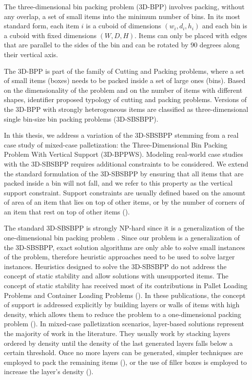 The three-dimensional bin packing problem (3D-BPP) involves packing, without any overlap, a set of small items into the minimum number of bins.
In its most standard form, each item $i$ is a cuboid of dimensions $(w_i, d_i, h_i)$ and each bin is a cuboid with fixed dimensions $(W, D, H)$.
Items can only be placed with edges that are parallel to the sides of the bin and can be rotated by $90$ degrees along their vertical axis.

The 3D-BPP is part of the family of Cutting and Packing problems, where a set of small items (boxes) needs to be packed inside a set of large ones (bins).
Based on the dimensionality of the problem and on the number of items with different shapes, \cite{WASCHER20071109} identifier proposed typology of cutting and packing problems. Versions of the 3D-BPP with strongly heterogeneous items are classified as three-dimensional single bin-size bin packing problems (3D-SBSBPP). 

In this thesis, we address a variation of the 3D-SBSBPP stemming from a real case study of mixed-case palletization: the Three-Dimensional Bin Packing Problem With Vertical Support (3D-BPPWS).
Modeling real-world case studies with the 3D-SBSBPP requires additional constraints to be considered. We extend the standard formulation of the 3D-SBSBPP by ensuring that all items that are packed inside a bin will not fall, and we refer to this property as the vertical support constraint.
Support constraints are usually defined based on the amount of area of an item that lies on top of other items, or by the number of corners of an item that rest on top of other items (\cite{GZARA20201062, paquay2016mixed, kurpel2020exact}).

The standard 3D-SBSBPP is strongly NP-hard since it is a generalization of the one-dimensional bin packing problem \citep{martello2000three}.
Since our problem is a generalization of the 3D-SBSBPP, exact solution algorithms are only able to solve small instances of the problem, therefore heuristic approaches need to be used to solve larger instances.
Heuristics designed to solve the 3D-SBSBPP do not address the concept of static stability and allow solutions with unsupported items.
The concept of static stability has received most of its contributions in Pallet Loading Problems and Container Loading Problems (\cite{Calzavara2021, kurpel2020exact}).
In these publications, the concept of support is addressed explicitly by building layers or walls of items with high density, which allows them to reduce the problem to a one-dimensional packing problem (\cite{BORTFELDT20131}).
In mixed-case palletization scenarios, layer-based solutions represent the majority of work in the literature. They usually work by stacking layers ordered by density until the density of the last generated layers falls below a certain threshold.
Once no more layers can be generated, simpler techniques are employed to pack the remaining items (\cite{elhedhli2019three}), or the use of filler boxes is employed to increase the layer's density (\cite{Calzavara2021}).


